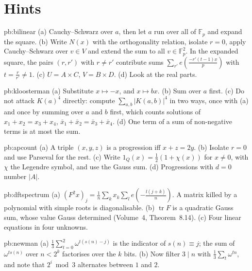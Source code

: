 \section{Hints}

\begin{hint}{pb:bilinear}
(a) Cauchy--Schwarz over $a$, then let $a$ run over all of $\mathbb F_p$ and expand the square. (b) Write $N(x)$ with the orthogonality
relation, isolate $r=0$, apply Cauchy--Schwarz over $v\in V$ and extend the sum to all $v\in\mathbb F_p^2$. In the expanded square, the
pairs $(r,r')$ with $r\ne r'$ contribute sums $\sum_{r'}e(\frac{-r'(t-1)x}p)$ with $t=\frac r{r'}\ne1$. (c) $U=A\times C$, $V=B\times D$. (d) Look at the
real parts.
\end{hint}

\begin{hint}{pb:kloosterman}
(a) Substitute $x\mapsto-x$, and $x\mapsto bx$. (b) Sum over $a$ first. (c) Do not attack $K(a)^4$ directly: compute $\sum_{a,b}|K(a,b)|^4$ in two
ways, once with (a) and once by summing over $a$ and $b$ first, which counts solutions of $x_1+x_2=x_3+x_4$, $\bar x_1+\bar x_2=\bar x_3+\bar x_4$.
(d) One term of a sum of non-negative terms is at most the sum.
\end{hint}

\begin{hint}{pb:apcount}
(a) A triple $(x,y,z)$ is a progression iff $x+z=2y$. (b) Isolate $r=0$ and use Parseval for the rest. (c) Write $1_Q(x)=\frac12(1+\chi(x))$
for $x\ne0$, with $\chi$ the Legendre symbol, and use the Gauss sum. (d) Progressions with $d=0$ number $|A|$.
\end{hint}

\begin{hint}{pb:dftspectrum}
(a) $(F^2x)_j=\frac1n\sum_kx_k\sum_le(-\frac{l(j+k)}n)$. A matrix killed by a polynomial with simple roots is diagonalisable. (b) $\operatorname{tr}F$ is a
quadratic Gauss sum, whose value Gauss determined (Volume~4, Theorem~8.14). (c) Four linear equations in four unknowns.
\end{hint}

\begin{hint}{pb:newman}
(a) $\frac13\sum_{t=0}^2\omega^{t(s(n)-j)}$ is the indicator of $s(n)\equiv j$; the sum of $\omega^{ts(n)}$ over $n<2^k$ factorises over the $k$ bits.
(b) Now filter $3\mid n$ with $\frac13\sum_t\omega^{tn}$, and note that $2^i\bmod3$ alternates between $1$ and $2$.
\end{hint}

